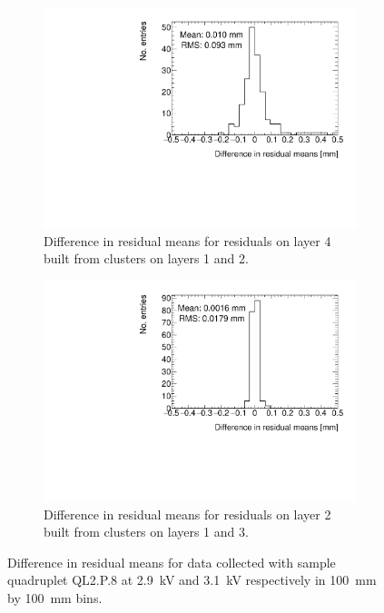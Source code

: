 \begin{figure}
\centering
\begin{subfigure}{.45\textwidth}
  \centering
  \includegraphics[width=0.97\linewidth]{figures/figure_compare_residual_fits_QL2P08_2900V_2021-05-21_minus_QL2P08_3100V_2021-05-21_layer4_fixedlayers12_mean_differences.pdf}
  \caption{Difference in residual means for residuals on layer 4 built from clusters on layers 1 and 2.}
  \label{fig:voltage_compare_fits_412}
\end{subfigure}\hfill
\begin{subfigure}{.45\textwidth}
  \centering
  \includegraphics[width=0.97\linewidth]{figures/figure_compare_residual_fits_QL2P08_2900V_2021-05-21_minus_QL2P08_3100V_2021-05-21_layer2_fixedlayers13_mean_differences.pdf}
  \caption{Difference in residual means for residuals on layer 2 built from clusters on layers 1 and 3.}
  \label{fig:voltage_compare_fits_213}
\end{subfigure}\hfill
\caption{Difference in residual means for data collected with sample quadruplet QL2.P.8 at \SI{2.9}{kV} and \SI{3.1}{kV} respectively in \SI{100}{\milli\meter} by \SI{100}{\milli\meter} bins.}
\label{fig:voltage_compare_fits}
\end{figure}

